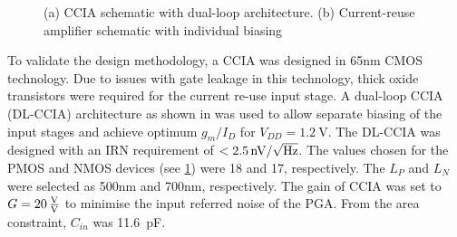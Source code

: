 \begin{figure}[!h]
\begin{subfigure}[c]{0.45\linewidth}
            \caption[]%
            {{\small }}
            \label{fig:CRCI}
        \end{subfigure}
        \caption[ Don't write caption here ]
        {\small (a) CCIA schematic with dual-loop architecture. (b) Current-reuse amplifier schematic with individual biasing } 
        \label{fig:DL-CCIA and CRCI separate biasing}
\end{figure}

To validate the design methodology, a CCIA was designed in 65nm CMOS technology. Due to issues with gate leakage in this technology, thick oxide transistors were required for the current re-use input stage. A dual-loop CCIA (DL-CCIA) architecture as shown in  was used to allow separate biasing of the input stages and achieve optimum $g_m/I_D$ for $V_{DD}=\SI{1.2}{\volt}$. The DL-CCIA was designed with an IRN requirement of $<\SI{2.5}{\nano\volt\per\sqrt{\hertz}}$. The \gmID values chosen for the PMOS and NMOS devices (see \cref{fig:CRCI}) were 18 and 17, respectively. The $L_P$ and $L_N$ were selected as 500nm and 700nm, respectively.  The gain of CCIA was set to $G=\SI{20}{\frac{\volt}{\volt}}$ to minimise the input referred noise of the PGA. From the area constraint, $C_{in}$ was \SI{11.6}{\pico\farad}.

